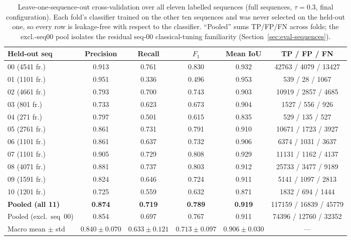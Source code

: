 \begin{table}[H]
  \centering
  \caption{Leave-one-sequence-out cross-validation over all eleven labelled
    sequences (full sequences, $\tau=0.3$, final configuration). Each fold's
    classifier trained on the other ten sequences and was never selected on the
    held-out one, so every row is leakage-free with respect to the classifier.
    ``Pooled'' sums TP/FP/FN across folds; the excl.-seq00 pool isolates the
    residual seq-00 classical-tuning familiarity (Section~\ref{sec:eval-sequences}).}
  \label{tab:loso}
  \setlength{\tabcolsep}{3pt}
  \footnotesize
  \begin{tabular}{lccccc}
    \toprule
    Held-out seq & Precision & Recall & $F_1$ & Mean IoU & TP / FP / FN \\
    \midrule
    00 (\num{4541} fr.) & 0.913 & 0.761 & 0.830 & 0.932 & \num{42763} / \num{4079} / \num{13427} \\
    01 (\num{1101} fr.) & 0.951 & 0.336 & 0.496 & 0.953 & \num{539} / \num{28} / \num{1067} \\
    02 (\num{4661} fr.) & 0.793 & 0.700 & 0.743 & 0.903 & \num{10919} / \num{2857} / \num{4685} \\
    03 (\num{801} fr.)  & 0.733 & 0.623 & 0.673 & 0.904 & \num{1527} / \num{556} / \num{926} \\
    04 (\num{271} fr.)  & 0.797 & 0.501 & 0.615 & 0.835 & \num{529} / \num{135} / \num{527} \\
    05 (\num{2761} fr.) & 0.861 & 0.731 & 0.791 & 0.910 & \num{10671} / \num{1723} / \num{3927} \\
    06 (\num{1101} fr.) & 0.861 & 0.637 & 0.732 & 0.906 & \num{6374} / \num{1031} / \num{3637} \\
    07 (\num{1101} fr.) & 0.905 & 0.729 & 0.808 & 0.929 & \num{11131} / \num{1162} / \num{4137} \\
    08 (\num{4071} fr.) & 0.881 & 0.737 & 0.803 & 0.912 & \num{25733} / \num{3477} / \num{9189} \\
    09 (\num{1591} fr.) & 0.824 & 0.646 & 0.724 & 0.911 & \num{5141} / \num{1097} / \num{2813} \\
    10 (\num{1201} fr.) & 0.725 & 0.559 & 0.632 & 0.871 & \num{1832} / \num{694} / \num{1444} \\
    \midrule
    \textbf{Pooled (all 11)} & \textbf{0.874} & \textbf{0.719} & \textbf{0.789} & \textbf{0.919} & \num{117159} / \num{16839} / \num{45779} \\
    Pooled (excl.\ seq~00)   & 0.854 & 0.697 & 0.767 & 0.911 & \num{74396} / \num{12760} / \num{32352} \\
    Macro mean $\pm$ std     & $0.840{\pm}0.070$ & $0.633{\pm}0.121$ & $0.713{\pm}0.097$ & $0.906{\pm}0.030$ & --- \\
    \bottomrule
  \end{tabular}
\end{table}

